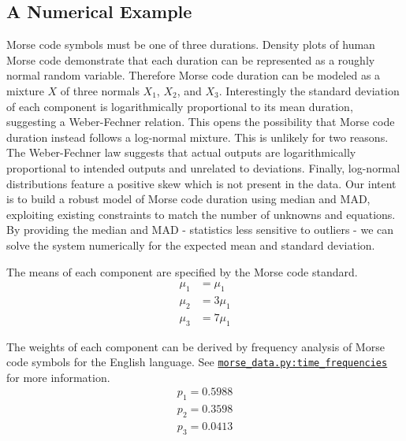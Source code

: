 \documentclass{article}
\newcommand{\fref}[2]{\href{#1}{\tt #2}}
\begin{document}
\subsection{A Numerical Example}

Morse code symbols must be one of three durations. Density plots of human Morse code demonstrate that each duration can be represented as a roughly normal random variable. Therefore Morse code duration can be modeled as a mixture $X$ of three normals $X_1$, $X_2$, and $X_3$. Interestingly the standard deviation of each component is logarithmically proportional to its mean duration, suggesting a Weber-Fechner relation. This opens the possibility that Morse code duration instead follows a log-normal mixture. This is unlikely for two reasons. The Weber-Fechner law suggests that actual outputs are logarithmically proportional to intended outputs and unrelated to deviations. Finally, log-normal distributions feature a positive skew which is not present in the data. Our intent is to build a robust model of Morse code duration using median and MAD, exploiting existing constraints to match the number of unknowns and equations. By providing the median and MAD - statistics less sensitive to outliers - we can solve the system numerically for the expected mean and standard deviation.

The means of each component are specified by the Morse code standard.
%
\begin{equation}\label{Morse Code Mean Component Functions}
\begin{split}
\mu_1 &= \mu_1 \\
\mu_2 &= 3 \mu_1 \\
\mu_3 &= 7 \mu_1
\end{split}
\end{equation}

The weights of each component can be derived by frequency analysis of Morse code symbols for the English language. See \fref{run:./morse\_data.py} {morse\_data.py:time\_frequencies} for more information.
%
\begin{equation}\label{Morse Code Weights}
\begin{split}
p_1 = 0.5988 \\
p_2 = 0.3598 \\
p_3 = 0.0413
\end{split}
\end{equation}
\end{document}
